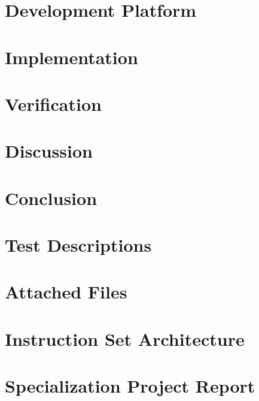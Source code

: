 \documentclass[a4paper,twoside,12pt]{book}
\begin{document}
\chapter{Development Platform}
    \label{ch:development-platform}
    

\chapter{Implementation}
    \label{ch:implementation}
    

\chapter{Verification}
    \label{ch:verification}
    

\chapter{Discussion}
    \label{ch:discussion}
    

\chapter{Conclusion}
    \label{ch:conclusion}
    

\cleardoublepage
{}
{}



\appendix

\chapter{Test Descriptions}
    \label{app:test-descriptions}
    

\chapter{Attached Files}
    \label{app:attached-files}
    

\chapter{Instruction Set Architecture}
    \label{app:isa}
    \cleardoublepage
    

\chapter{Specialization Project Report}
    \label{app:specialization-project}
    \cleardoublepage
    
\end{document}
